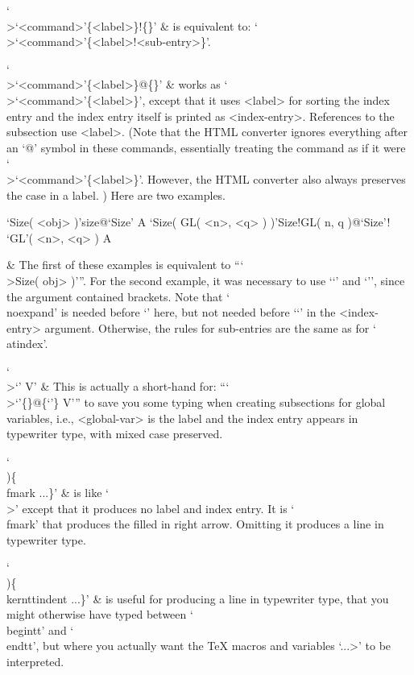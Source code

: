 `\\>\lq<command>\rq\{<label>\}!\{<sub-entry>\}' &
    is equivalent to: `\\>\lq<command>\rq\{<label>!<sub-entry>\}'.

`\\>\lq<command>\rq\{<label>\}@\{<index-entry>\}' &
    works as `\\>\lq<command>\rq\{<label>\}', except that it uses <label>
    for sorting the index entry and the index entry itself is printed  as
    <index-entry>. References to the subsection use <label>.  (Note  that
    the HTML converter ignores everything after an `@'  symbol  in  these
    commands,  essentially  treating  the   command   as   if   it   were
    `\\>\lq<command>\rq\{<label>\}'. However,  the  HTML  converter  also
    always preserves the case in a label. ) Here are two examples.

\begintt
\>`Size( <obj> )'{size}@{`Size'} A
\>`Size( GL( <n>, <q> ) )'{Size!GL( n, q )}@{`Size'! `GL'( \noexpand<n>, \noexpand<q> )} A
\endtt

  & The first of these examples is equivalent to ``{`\\>Size( \<obj> )'}''.
    For the second example, it was necessary  to  use  `\lq'  and  `\rq',
    since the argument contained  brackets.  Note  that  `\\noexpand'  is
    needed  before  `\<'  here,  but  not  needed  before  `\lq'  in  the
    <index-entry> argument. Otherwise, the rules for sub-entries are  the
    same as for `\\atindex'.

`\\>\lq<global-var>{\rq} V' &
    This is actually a short-hand for: 
    ``{`\\>\lq<global-var>\rq\{<global-var>\}@\{\lq<global-var>\rq\} V'}''
    to  save  you  some  typing  when  creating  subsections  for  global
    variables, i.e., <global-var>  is  the  label  and  the  index  entry
    appears in typewriter type, with mixed case preserved.

`\\)\{\\fmark ...\}' &
    is like `\\>' except that it produces no label and index entry. It is
    `\\fmark' that produces  the  filled  in  right  arrow.  Omitting  it
    produces a line in typewriter type.

`\\)\{\\kernttindent ...\}' &
    is useful for producing a line in typewriter  type,  that  you  might
    otherwise have typed between `\\begintt' and `\\endtt', but where you
    actually  want  the  {\TeX}  macros  and  variables  `\<...>'  to  be
    interpreted.

